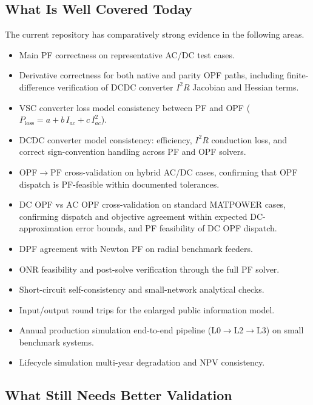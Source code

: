 \subsection{What Is Well Covered Today}

The current repository has comparatively strong evidence in the following areas.
\begin{itemize}
  \item Main PF correctness on representative AC/DC test cases.
  \item Derivative correctness for both native and parity OPF paths, including
  finite-difference verification of DCDC converter \(I^2R\) Jacobian and Hessian
  terms.
  \item VSC converter loss model consistency between PF and OPF
  (\(P_{\mathrm{loss}} = a + b\,I_{ac} + c\,I_{ac}^2\)).
  \item DCDC converter model consistency: efficiency, \(I^2R\) conduction loss,
  and correct sign-convention handling across PF and OPF solvers.
  \item OPF\(\to\)PF cross-validation on hybrid AC/DC cases, confirming
  that OPF dispatch is PF-feasible within documented tolerances.
  \item DC OPF vs AC OPF cross-validation on standard MATPOWER cases,
  confirming dispatch and objective agreement within expected DC-approximation
  error bounds, and PF feasibility of DC OPF dispatch.
  \item DPF agreement with Newton PF on radial benchmark feeders.
  \item ONR feasibility and post-solve verification through the full PF solver.
  \item Short-circuit self-consistency and small-network analytical checks.
  \item Input/output round trips for the enlarged public information model.
  \item Annual production simulation end-to-end pipeline (L0\(\to\)L2\(\to\)L3) on small benchmark systems.
  \item Lifecycle simulation multi-year degradation and NPV consistency.
\end{itemize}

\subsection{What Still Needs Better Validation}

